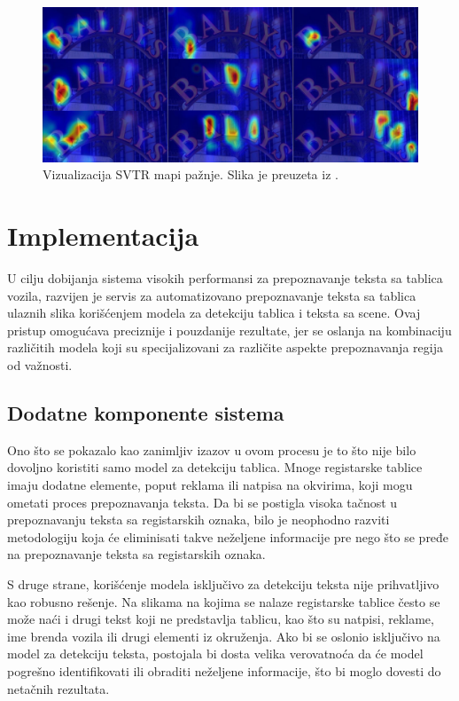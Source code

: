 \documentclass[a4paper,12pt]{article}
\begin{document}
	\begin{figure}[H]
		\centering
		\includegraphics[width=\textwidth]{assets/visualization-of-svtr-attention-maps.png}
		\caption{Vizualizacija SVTR mapi pažnje. Slika je preuzeta iz \cite{du2022svtrscenetextrecognition}.}
		\label{fig:visualization-of-svtr-attention-maps}
	\end{figure}
	\newpage
	
	\section{Implementacija}
	U cilju dobijanja sistema visokih performansi za prepoznavanje teksta sa tablica vozila, razvijen je servis za automatizovano prepoznavanje teksta sa tablica ulaznih slika korišćenjem modela za detekciju tablica i teksta sa scene. Ovaj pristup omogućava preciznije i pouzdanije rezultate, jer se oslanja na kombinaciju različitih modela koji su specijalizovani za različite aspekte prepoznavanja regija od važnosti.
	
	\subsection{Dodatne komponente sistema}
	Ono što se pokazalo kao zanimljiv izazov u ovom procesu je to što nije bilo dovoljno koristiti samo model za detekciju tablica. Mnoge registarske tablice imaju dodatne elemente, poput reklama ili natpisa na okvirima, koji mogu ometati proces prepoznavanja teksta. Da bi se postigla visoka tačnost u prepoznavanju teksta sa registarskih oznaka, bilo je neophodno razviti metodologiju koja će eliminisati takve neželjene informacije pre nego što se pređe na prepoznavanje teksta sa registarskih oznaka.
	
	S druge strane, korišćenje modela isključivo za detekciju teksta nije prihvatljivo kao robusno rešenje. Na slikama na kojima se nalaze registarske tablice često se može naći i drugi tekst koji ne predstavlja tablicu, kao što su natpisi, reklame, ime brenda vozila ili drugi elementi iz okruženja. Ako bi se oslonio isključivo na model za detekciju teksta, postojala bi dosta velika verovatnoća da će model pogrešno identifikovati ili obraditi neželjene informacije, što bi moglo dovesti do netačnih rezultata.
	
\end{document}
